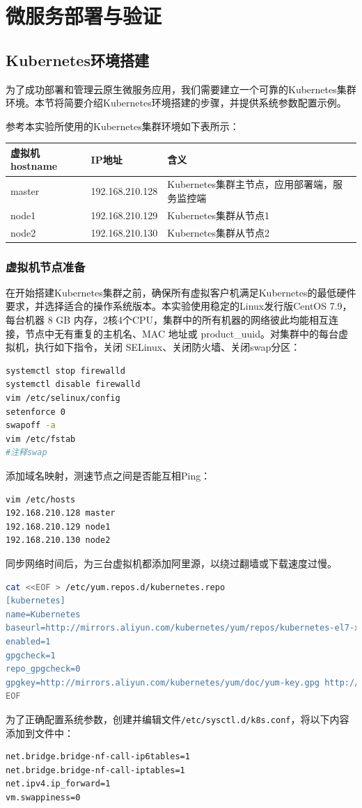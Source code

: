 \chapter{微服务部署与验证}
\section{Kubernetes环境搭建}
为了成功部署和管理云原生微服务应用，我们需要建立一个可靠的Kubernetes集群环境。本节将简要介绍Kubernetes环境搭建的步骤，并提供系统参数配置示例。

参考本实验所使用的Kubernetes集群环境如下表所示：

\begin{table}[ht]\centering
\begin{tabular}{l|l|l}
	\hline\hline
	虚拟机hostname        & IP地址&含义              \\ \hline
	master&192.168.210.128&Kubernetes集群主节点，应用部署端，服务监控端 \\ \hline
	node1&192.168.210.129& Kubernetes集群从节点1\\ \hline
	node2&192.168.210.130& Kubernetes集群从节点2\\ 
\hline\hline
\end{tabular}
\end{table}
\subsection{虚拟机节点准备}
在开始搭建Kubernetes集群之前，确保所有虚拟客户机满足Kubernetes的最低硬件要求，并选择适合的操作系统版本。本实验使用稳定的Linux发行版CentOS 7.9，每台机器 8 GB 内存，2核4个CPU，集群中的所有机器的网络彼此均能相互连接，节点中无有重复的主机名、MAC 地址或 product\_uuid。对集群中的每台虚拟机，执行如下指令，关闭 SELinux、关闭防火墙、关闭swap分区：
\begin{lstlisting}[language=bash]
systemctl stop firewalld
systemctl disable firewalld
vim /etc/selinux/config
setenforce 0
swapoff -a
vim /etc/fstab
#注释swap
\end{lstlisting}
添加域名映射，测速节点之间是否能互相Ping：
\begin{lstlisting}[language=bash]
vim /etc/hosts
192.168.210.128 master
192.168.210.129 node1
192.168.210.130 node2
\end{lstlisting}
同步网络时间后，为三台虚拟机都添加阿里源，以绕过翻墙或下载速度过慢。
\begin{lstlisting}[language=bash]
cat <<EOF > /etc/yum.repos.d/kubernetes.repo
[kubernetes]
name=Kubernetes
baseurl=http://mirrors.aliyun.com/kubernetes/yum/repos/kubernetes-el7-x86_64
enabled=1
gpgcheck=1
repo_gpgcheck=0
gpgkey=http://mirrors.aliyun.com/kubernetes/yum/doc/yum-key.gpg http://mirrors.aliyun.com/kubernetes/yum/doc/rpm-package-key.gpg
EOF
\end{lstlisting}
为了正确配置系统参数，创建并编辑文件\texttt{/etc/sysctl.d/k8s.conf}，将以下内容添加到文件中：
\begin{lstlisting}[language=bash]
net.bridge.bridge-nf-call-ip6tables=1
net.bridge.bridge-nf-call-iptables=1
net.ipv4.ip_forward=1
vm.swappiness=0
\end{lstlisting}

